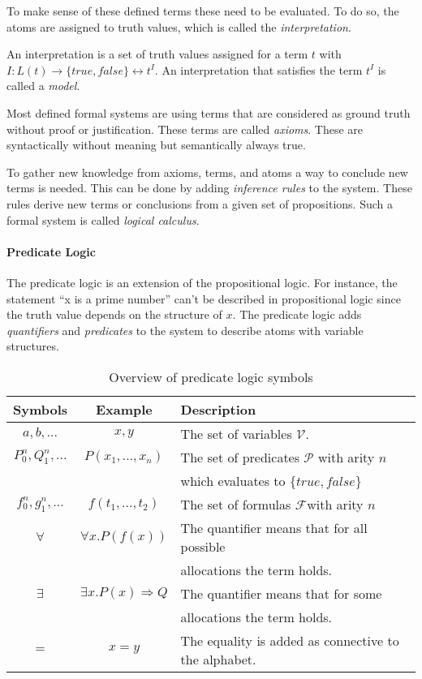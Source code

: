 To make sense of these defined terms these need to be evaluated. To do so,
the atoms are assigned to truth values, which is called the \textit{interpretation}.~\cite{tuschik1994mathematische}

\begin{defi}
  An interpretation is a set of truth values assigned for a term $t$ with
  $I:L(t)\rightarrow \{true,false\} \leftrightarrow t^I$. An interpretation that satisfies the term
  $t^I$ is called a \textit{model}.
\end{defi}

Most defined formal systems are using terms that are considered as ground truth without
proof or justification. These terms are called \textit{axioms}. These are syntactically
without meaning but semantically always true.~\cite{tuschik1994mathematische}

To gather new knowledge from axioms, terms, and atoms a way to conclude
new terms is needed. This can be done by adding \textit{inference rules} to
the system. These rules derive new terms or conclusions from a given
set of propositions. Such a formal system is called \textit{logical calculus}.~\cite{tuschik1994mathematische}

\paragraph{Predicate Logic}
The predicate logic is an extension of the propositional logic.
For instance, the statement ``x is a prime number'' can't be described
in propositional logic since the truth value depends on the structure of $x$.
The predicate logic adds \textit{quantifiers} and \textit{predicates} to the
system to describe atoms with variable structures.~\cite{heinemann2013logik}

\begin{table}[h]
  \centering
  \begin{tabular}{c|c|l}
    Symbols & Example & Description\\\hline
    $a,b,...$ & $x,y$ & The set of variables $\mathcal{V}$.\\
    $P_0^n,Q_1^n,...$ & $P(x_1,...,x_n)$ & The set of predicates $\mathcal{P}$ with arity $n$\\
            & &                           which evaluates to $\{true,false\}$\\
    $f_0^n,g_1^n,...$ & $f(t_1,...,t_2)$ & The set of formulas $\mathcal{F}$with arity $n$\\
    $\forall$ & $\forall x.P(f(x))$ & The quantifier means that for all possible\\
            & & allocations the term holds.\\
    $\exists$ & $\exists x.P(x)\Rightarrow Q$ & The quantifier means that for some\\
    & & allocations the term holds.\\
    $=$ & $x = y$ & The equality is added as connective to the alphabet.\\
  \end{tabular}
  \caption{Overview of predicate logic symbols}
  \label{tab:predlogic}
\end{table}

